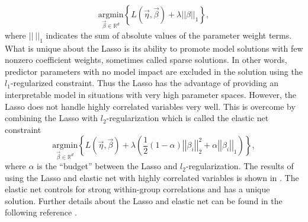 \begin{equation}
\underset{\vec{\beta}\in\mathbb{R}^{d}}{\text{argmin}}\left\{ L\left(\vec{\eta},\vec{\beta}\right)+\lambda\left|\left|\beta\right|\right|_{1}\right\} ,\label{eq:LassoRegressionGeneral}
\end{equation}
where $\left|\left|\ \right|\right|_{1}$ indicates the sum of absolute
values of the parameter weight terms. What is unique about the Lasso
is its ability to promote model solutions with few nonzero coefficient
weights, sometimes called sparse solutions. In other words, predictor
parameters with no model impact are excluded in the solution using
the $l_{1}$-regularized constraint. Thus the Lasso has the advantage
of providing an interpretable model in situations with very high parameter
spaces. However, the Lasso does not handle highly correlated variables
very well. This is overcome by combining the Lasso with $l_{2}$-regularization
which is called the elastic net constraint
\[
\underset{\vec{\beta}\in\mathbb{R}^{d}}{\text{argmin}}\left\{ L\left(\vec{\eta},\vec{\beta}\right)+\lambda\left(\frac{1}{2}\left(1-\alpha\right)\left|\left|\beta_{i}\right|\right|_{2}^{2}+\alpha\left|\left|\beta_{i}\right|\right|_{1}\right)\right\} ,
\]
where $\alpha$ is the ``budget'' between the Lasso and $l_{2}$-regularization.
The results of using the Lasso and elastic net with highly correlated
variables is shown in . The
elastic net controls for strong within-group correlations and has
a unique solution. Further details about the Lasso and elastic net
can be found in the following reference \cite{alma991031702535903361}.

